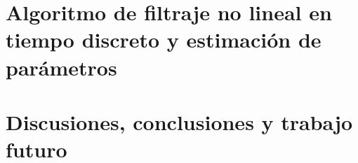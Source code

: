 \documentclass[
	spanish, %
	letterpaper, oneside
]{book}
\begin{document}
\chapter{Algoritmo de filtraje no lineal en tiempo discreto y estimación de parámetros}


\chapter{Discusiones, conclusiones y trabajo futuro}


\begin{appendixd}
    
\end{appendixd}





\end{document}
